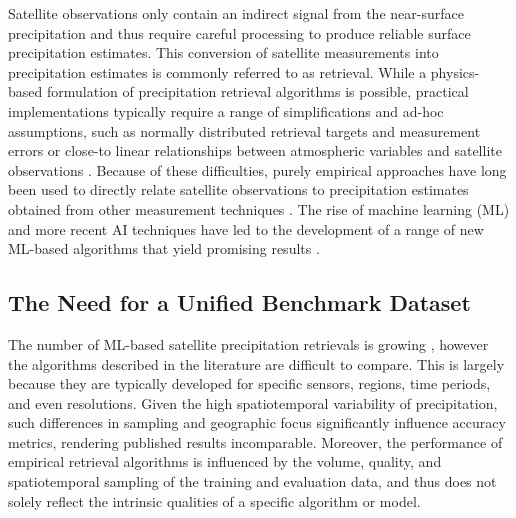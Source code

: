 \documentclass[11pt]{article}
\begin{document}
Satellite observations only contain an indirect signal from the near-surface
precipitation and thus require careful processing to produce reliable surface
precipitation estimates. This conversion of satellite measurements into
precipitation estimates is commonly referred to as retrieval. While a
physics-based formulation of precipitation retrieval algorithms is possible,
practical implementations typically require a range of simplifications and
ad-hoc assumptions, such as normally distributed retrieval targets and
measurement errors or close-to linear relationships between atmospheric
variables and satellite observations \citep{Boukabara2011MiRS,
	Kummerow2015GPROF, Maahn2020OptimalEstimation}. Because of these difficulties,
purely empirical approaches have long been used to directly relate satellite
observations to precipitation estimates obtained from other measurement
techniques \citep{ Griffith1978RainEstimation, Adler1988InfraredRainfall,
	Hong2004Precipitation}. The rise of machine learning (ML) and more recent AI
techniques have led to the development of a range of new ML-based
algorithms that yield promising results \citep{Sadeghi2019Persiann,
	Pfreundschuh2022BrazilRetrieval, Pfreundschuh2022Gprof, Gorooh2023LEOGEO}.


\subsection{The Need for a Unified Benchmark Dataset}

The number of ML-based satellite precipitation retrievals is
growing \citep{Sano2018PNPR, Amell2025Probabilistic}, however the algorithms
described in the literature are difficult to compare. This is largely because
they are typically developed for specific sensors, regions, time periods, and
even resolutions. Given the high spatiotemporal variability of precipitation,
such differences in sampling and geographic focus significantly influence
accuracy metrics, rendering published results incomparable. Moreover, the
performance of empirical retrieval algorithms is influenced by the volume,
quality, and spatiotemporal sampling of the training and evaluation data, and
thus does not solely reflect the intrinsic qualities of a specific algorithm or
model.
\end{document}
